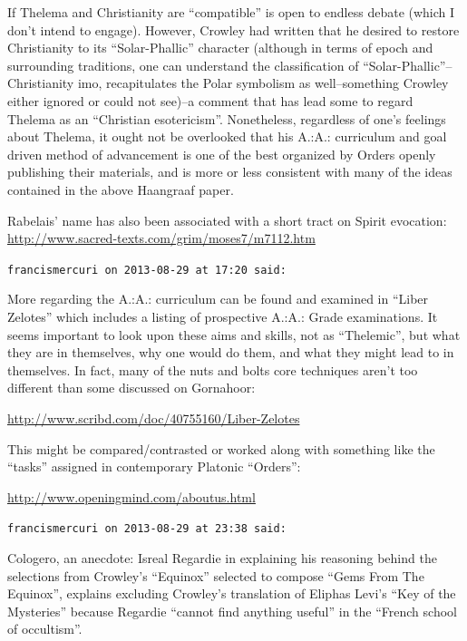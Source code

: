 \begin{footnotesize}
\begin{sffamily}
If Thelema and Christianity are ``compatible'' is open to endless debate (which I don't intend to engage). However, Crowley had written that he desired to restore Christianity to its ``Solar-Phallic'' character (although in terms of epoch and surrounding traditions, one can understand the classification of ``Solar-Phallic''--Christianity imo, recapitulates the Polar symbolism as well--something Crowley either ignored or could not see)--a comment that has lead some to regard Thelema as an ``Christian esotericism''. Nonetheless, regardless of one's feelings about Thelema, it ought not be overlooked that his A.:A.: curriculum and goal driven method of advancement is one of the best organized by Orders openly publishing their materials, and is more or less consistent with many of the ideas contained in the above Haangraaf paper.

Rabelais' name has also been associated with a short tract on Spirit evocation:\\
\url{http://www.sacred-texts.com/grim/moses7/m7112.htm}


\hfill

\texttt{francismercuri on 2013-08-29 at 17:20 said:}

More regarding the A.:A.: curriculum can be found and examined in ``Liber Zelotes'' which includes a listing of prospective A.:A.: Grade examinations. It seems important to look upon these aims and skills, not as ``Thelemic'', but what they are in themselves, why one would do them, and what they might lead to in themselves. In fact, many of the nuts and bolts core techniques aren't too different than some discussed on Gornahoor:

\url{http://www.scribd.com/doc/40755160/Liber-Zelotes}


This might be compared/contrasted or worked along with something like the ``tasks'' assigned in contemporary Platonic ``Orders'':

\url{http://www.openingmind.com/aboutus.html}


\hfill

\texttt{francismercuri on 2013-08-29 at 23:38 said:}

Cologero, an anecdote: Isreal Regardie in explaining his reasoning behind the selections from Crowley's ``Equinox'' selected to compose ``Gems From The Equinox'', explains excluding Crowley's translation of Eliphas Levi's ``Key of the Mysteries'' because Regardie ``cannot find anything useful'' in the ``French school of occultism''.


\end{sffamily}
\end{footnotesize}
